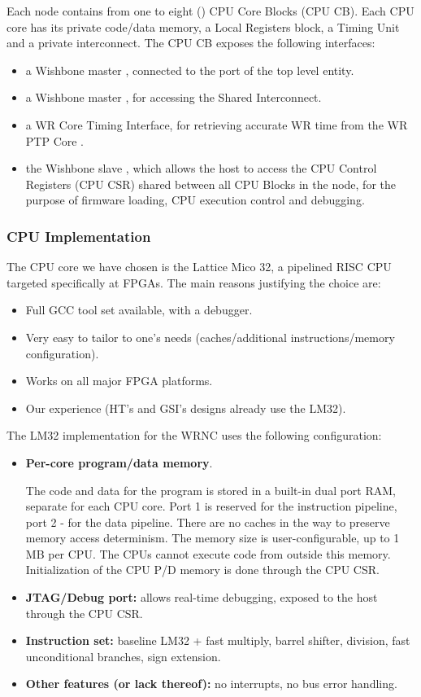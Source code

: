 \documentclass{article}
\begin{document}
Each node contains from one to eight () CPU Core Blocks (CPU CB).  Each CPU core has its private code/data memory, a Local Registers block, a Timing Unit and a private interconnect. The CPU CB exposes the following interfaces:
\begin{itemize}
\item a Wishbone master , connected to the  port of the top level entity.
\item a Wishbone master , for accessing the Shared Interconnect.
\item a WR Core Timing Interface, for retrieving accurate WR time from the WR PTP Core \cite{wrpc}.
\item the Wishbone slave , which allows the host to access the CPU Control Registers (CPU CSR) shared between all CPU Blocks in the node, for the purpose of firmware loading, CPU execution control and debugging.
\end{itemize}


\subsubsection{CPU Implementation}

The CPU core we have chosen is the Lattice Mico 32, a pipelined RISC CPU targeted specifically at FPGAs. The main reasons justifying the choice are:
\begin{itemize}
\item Full GCC tool set available, with a debugger.
\item Very easy to tailor to one's needs (caches/additional instructions/memory configuration).
\item Works on all major FPGA platforms.
\item Our experience (HT's and GSI's designs already use the LM32).
\end{itemize}

The LM32 implementation for the WRNC uses the following configuration:
\begin{itemize}
\item \textbf{Per-core program/data memory}.

The code and data for the program is stored in a built-in dual port RAM,
separate for each CPU core. Port 1 is reserved for the instruction pipeline, 
port 2 - for the data pipeline. There are no caches in the way to preserve 
memory access determinism. The memory size is user-configurable, up to 1 MB per CPU. 
The CPUs cannot execute code from outside this memory. Initialization of the 
CPU P/D memory is done through the CPU CSR.

\item \textbf{JTAG/Debug port:} allows real-time debugging, exposed to the host through the CPU CSR.

\item \textbf{Instruction set:} baseline LM32 + fast multiply, barrel shifter, division, fast unconditional branches, sign extension.

\item \textbf{Other features (or lack thereof):} no interrupts, no bus error handling.
\end{itemize}
\end{document}
